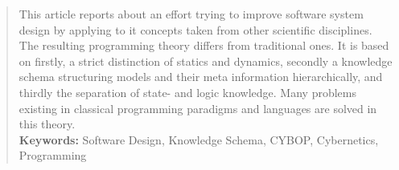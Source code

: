 %
%
%
%
%
%
%

\begin{abstract}
This article reports about an effort trying to improve software system design
by applying to it concepts taken from other scientific disciplines. The
resulting programming theory differs from traditional ones. It is based on
firstly, a strict distinction of statics and dynamics, secondly a knowledge
schema structuring models and their meta information hierarchically, and
thirdly the separation of state- and logic knowledge. Many problems existing in
classical programming paradigms and languages are solved in this theory.\\
\textbf{Keywords:} Software Design, Knowledge Schema, CYBOP, Cybernetics,
Programming
\end{abstract}

